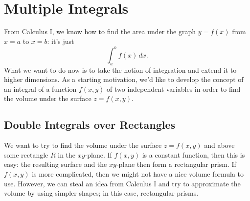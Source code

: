 \documentclass[10pt,]{book}
\numberwithin{equation}{section}
\begin{document}
\chapter[{Multiple Integrals}]{Multiple Integrals}\label{multiple-integrals}
\begin{introduction}{}%
\hypertarget{p-1456}{}%
From Calculus I, we know how to find the area under the graph \(y = f(x)\) from \(x = a\) to \(x = b\): it's just%
\begin{equation*}
\int_{a}^{b}f(x)\,dx.
\end{equation*}
What we want to do now is to take the notion of integration and extend it to higher dimensions. As a starting motivation, we'd like to develop the concept of an integral of a function \(f(x,y)\) of two independent variables in order to find the volume under the surface \(z = f(x,y)\).%
\end{introduction}%
%
%
\typeout{************************************************}
\typeout{************************************************}
%
\section[{Double Integrals over Rectangles}]{Double Integrals over Rectangles}\label{section-double-integrals-over-rectangles}
\begin{introduction}{}%
\hypertarget{p-1457}{}%
We want to try to find the volume under the surface \(z = f(x,y)\) and above some rectangle \(R\) in the \(xy\)-plane. If \(f(x,y)\) is a constant function, then this is easy: the resulting surface and the \(xy\)-plane then form a rectangular prism. If \(f(x,y)\) is more complicated, then we might not have a nice volume formula to use. However, we can steal an idea from Calculus I and try to approximate the volume by using simpler shapes; in this case, rectangular prisms.%
\end{introduction}%
%
%
\typeout{************************************************}
\typeout{************************************************}
%
\end{document}
